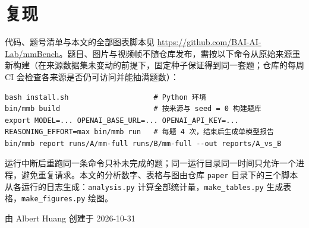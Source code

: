 \documentclass[11pt,a4paper,fontset=none]{ctexart}
\begin{document}
\section{复现}
\label{app:repro}

代码、题号清单与本文的全部图表脚本见 \url{https://github.com/BAI-AI-Lab/mmBench}。题目、图片与视频帧不随仓库发布，需按以下命令从原始来源重新构建（在来源数据集未变动的前提下，固定种子保证得到同一套题；仓库的每周 CI 会检查各来源是否仍可访问并能抽满题数）：

\begin{small}
\begin{verbatim}
bash install.sh                    # Python 环境
bin/mmb build                      # 按来源与 seed = 0 构建题库
export MODEL=... OPENAI_BASE_URL=... OPENAI_API_KEY=...
REASONING_EFFORT=max bin/mmb run   # 每题 4 次，结束后生成单模型报告
bin/mmb report runs/A/mm-full runs/B/mm-full --out reports/A_vs_B
\end{verbatim}
\end{small}

运行中断后重跑同一条命令只补未完成的题；同一运行目录同一时间只允许一个进程，避免重复请求。本文的分析数字、表格与图由仓库 \texttt{paper} 目录下的三个脚本从各运行的日志生成：\texttt{analysis.py} 计算全部统计量，\texttt{make\_tables.py} 生成表格，\texttt{make\_figures.py} 绘图。


\vspace{2em}\begin{flushright}由 Albert Huang 创建于 2026-10-31\end{flushright}
\end{document}
